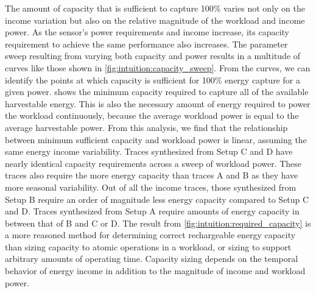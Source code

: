 
The amount of capacity that is sufficient to capture 100\% varies not only on the income variation but also on the relative magnitude of the workload and income power.
As the sensor's power requirements and income increase, its capacity requirement to achieve the same performance also increases. 
The parameter sweep resulting from varying both capacity and power results in a multitude of curves like those shown in \cref{fig:intuition:capacity_sweep}. 
From the curves, we can identify the points at which capacity is sufficient for 100\% energy capture for a given power.  shows the minimum capacity required to capture all of the available harvestable energy. This is also the necessary amount of energy required to power the workload continuously, because the average workload power is equal to the average harvestable power. 
From this analysis, we find that the relationship between minimum sufficient capacity and workload power is linear, assuming the same energy income variability. 
Traces synthesized from Setup C and D have nearly identical capacity requirements across a sweep of workload power. These traces also require the more energy capacity than traces A and B as they have more seasonal variability. 
Out of all the income traces, those synthesized from Setup B require an order of magnitude less energy capacity compared to Setup C and D. 
Traces synthesized from Setup A require amounts of energy capacity in between that of B and C or D.
The result from \cref{fig:intuition:required_capacity} is a more reasoned method for determining correct rechargeable energy capacity than sizing capacity to atomic operations in a workload, or sizing to support arbitrary amounts of operating time.
Capacity sizing depends on the temporal behavior of energy income in addition to the magnitude of income and workload power. 

